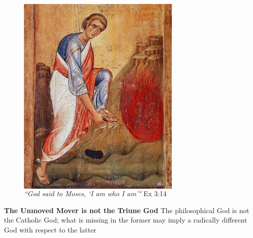 \documentclass[xcolor=dvipsnames]{beamer}
\begin{document}
\begin{frame}[plain]
\begin{figure}
  \centering
  \begin{columns}
    \centering
    \includegraphics[width=0.7\textwidth,trim=0 100mm 0 0, clip]{burning-bush}
    \caption {\emph{``God said to Moses, `I am who I am'"} Ex 3:14}
  \end{columns}
\end{figure}
\end{frame}


\begin{frame}[plain]
\textbf{The Unmoved Mover is not the Triune God}\newline
The philosophical God is not the Catholic God; what is missing in the former may imply a radically different God with respect to the latter \vspace{10mm}
\end{frame}
\end{document}
